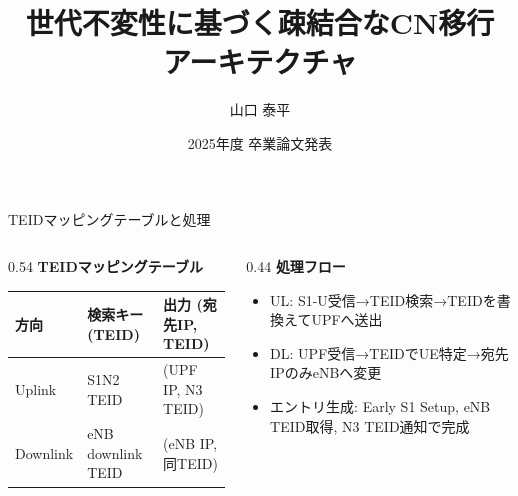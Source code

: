 \documentclass[dvipdfmx,11pt,aspectratio=169]{beamer}
\title{世代不変性に基づく疎結合なCN移行\\アーキテクチャ}
\author{山口 泰平}
\institute{慶應義塾大学 総合政策学部}
\date{2025年度 卒業論文発表}
\begin{document}
\begin{frame}
  \titlepage
\end{frame}

\begin{frame}{TEIDマッピングテーブルと処理}
  \begin{columns}[T]
    \begin{column}{0.54\textwidth}
      \textbf{TEIDマッピングテーブル}
      \begin{table}
        \tiny
        \begin{tabular}{|l|l|l|}
          \hline
          方向 & 検索キー(TEID) & 出力 (宛先IP, TEID) \\
          \hline
          Uplink & S1N2 TEID & (UPF IP, N3 TEID) \\
          \hline
          Downlink & eNB downlink TEID & (eNB IP, 同TEID) \\
          \hline
        \end{tabular}
      \end{table}
    \end{column}
    \begin{column}{0.44\textwidth}
      \textbf{処理フロー}
      \begin{itemize}
        \item UL: S1-U受信→TEID検索→TEIDを書換えてUPFへ送出
        \item DL: UPF受信→TEIDでUE特定→宛先IPのみeNBへ変更
        \item エントリ生成: Early S1 Setup, eNB TEID取得, N3 TEID通知で完成
      \end{itemize}
    \end{column}
  \end{columns}
\end{frame}
\end{document}
